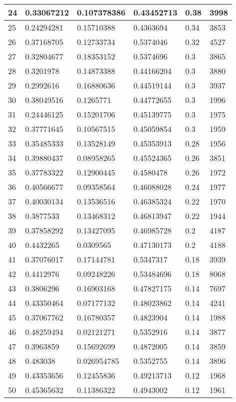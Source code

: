 \begin{longtable}{|l|l|l|l|l|l|}
24 & 0.33067212 & 0.107378386 & 0.43452713 & 0.38 & 3998 \\ \hline 
25 & 0.24294281 & 0.15710388 & 0.4363694 & 0.34 & 3853 \\ \hline 
26 & 0.37168705 & 0.12733734 & 0.5374046 & 0.32 & 4527 \\ \hline 
27 & 0.32804677 & 0.18353152 & 0.5374696 & 0.3 & 3865 \\ \hline 
28 & 0.3201978 & 0.14873388 & 0.44166204 & 0.3 & 3880 \\ \hline 
29 & 0.2992616 & 0.16880636 & 0.44519144 & 0.3 & 3937 \\ \hline 
30 & 0.38049516 & 0.1265771 & 0.44772655 & 0.3 & 1996 \\ \hline 
31 & 0.24446125 & 0.15201706 & 0.45139775 & 0.3 & 1975 \\ \hline 
32 & 0.37771645 & 0.10567515 & 0.45059854 & 0.3 & 1959 \\ \hline 
33 & 0.35485333 & 0.13528149 & 0.45353913 & 0.28 & 1956 \\ \hline 
34 & 0.39880437 & 0.08958265 & 0.45524365 & 0.26 & 3851 \\ \hline 
35 & 0.37783322 & 0.12900445 & 0.4580478 & 0.26 & 1972 \\ \hline 
36 & 0.40566677 & 0.09358564 & 0.46088028 & 0.24 & 1977 \\ \hline 
37 & 0.40030134 & 0.13536516 & 0.46385324 & 0.22 & 1970 \\ \hline 
38 & 0.3877533 & 0.13468312 & 0.46813947 & 0.22 & 1944 \\ \hline 
39 & 0.37858292 & 0.13427095 & 0.46985728 & 0.2 & 4187 \\ \hline 
40 & 0.4432265 & 0.0309565 & 0.47130173 & 0.2 & 4188 \\ \hline 
41 & 0.37076017 & 0.17144781 & 0.5347317 & 0.18 & 3939 \\ \hline 
42 & 0.4412976 & 0.09248226 & 0.53484696 & 0.18 & 8068 \\ \hline 
43 & 0.3806296 & 0.16903168 & 0.47827175 & 0.14 & 7697 \\ \hline 
44 & 0.43350464 & 0.07177132 & 0.48023862 & 0.14 & 4241 \\ \hline 
45 & 0.37067762 & 0.16780357 & 0.4823904 & 0.14 & 1988 \\ \hline 
46 & 0.48259494 & 0.02121271 & 0.5352916 & 0.14 & 3877 \\ \hline 
47 & 0.3963859 & 0.15692699 & 0.4872005 & 0.14 & 3859 \\ \hline 
48 & 0.483038 & 0.026954785 & 0.5352755 & 0.14 & 3896 \\ \hline 
49 & 0.43353656 & 0.12455836 & 0.49213713 & 0.12 & 1968 \\ \hline 
50 & 0.45365632 & 0.11386322 & 0.4943002 & 0.12 & 1961 \\ \hline 
\end{longtable}
